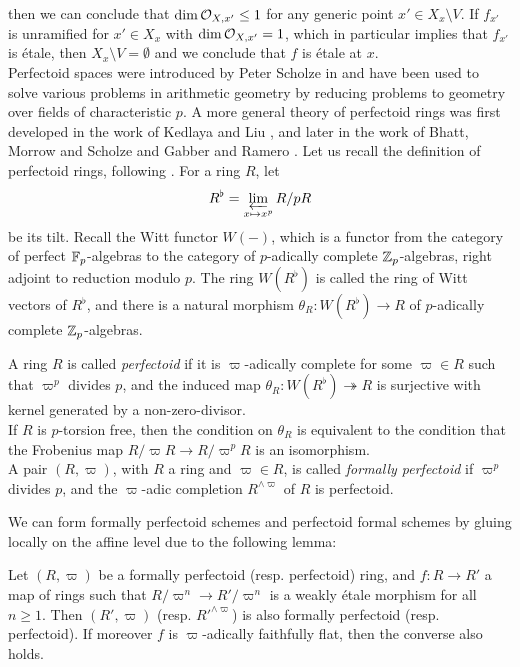 then we can conclude that $\dim \cal{O}_{X,x'} \le 1$ for any generic point $x' \in X_{x} \setminus V$. If $f_{x'}$ is unramified for $x' \in X_{x}$ with $\dim{\cal{O}_{X,x'}}=1$,
which in particular implies that $f_{x'}$ is \'{e}tale, then $X_{x} \setminus V = \emptyset$ and we conclude that $f$ is \'{e}tale at $x$.\\
\indent Perfectoid spaces were introduced by Peter Scholze in \cite{scholze2012perfectoid} and have been used to solve various problems in arithmetic geometry
by reducing problems to geometry over fields of characteristic $p$. A more general theory of perfectoid rings was first developed in
the work of Kedlaya and Liu \cite{kedlaya2015relative}, and later in the work of Bhatt, Morrow and Scholze \cite{bms} and Gabber and Ramero \cite{gabber2018almost}. 
Let us recall the definition of perfectoid rings, following \cite[Section 2.1]{purflat}. 
For a ring $R$, let 
\[R^{\flat} = \varprojlim_{x \mapsto x^p} R/pR\]
be its tilt.  Recall the Witt functor $W(-)$, which 
is a functor from the category of perfect $\bb{F}_p$-algebras to the category of $p$-adically complete $\bb{Z}_p$-algebras, right
adjoint to reduction modulo $p$. The ring $W(R^{\flat})$ is called the ring of Witt vectors of $R^{\flat}$, 
and there is a natural morphism $\theta_{R}: W(R^{\flat}) \to R$ of $p$-adically complete $\bb{Z}_p$-algebras.
\begin{definition}\label{def:perfectoid}
A ring $R$ is called \textit{perfectoid} if it is $\varpi$-adically complete for some $\varpi \in R$ such that $\varpi^p$ divides $p$,
and the induced map $\theta_{R}: W(R^{\flat}) \twoheadrightarrow R$ is surjective with kernel generated by a non-zero-divisor.\\
\indent If $R$ is $p$-torsion free, then the condition on $\theta_{R}$ is equivalent to the condition that the Frobenius map $R/\varpi R \to R/\varpi^p R$ is an isomorphism.\\
\indent A pair $(R,\varpi)$, with $R$ a ring and $\varpi \in R$, is called \textit{formally perfectoid} if $\varpi^p$ divides $p$, 
and the $\varpi$-adic completion $R^{\wedge \varpi}$ of $R$ is perfectoid.
\end{definition}
We can form formally perfectoid schemes and perfectoid formal schemes by gluing locally on the affine level due to the following lemma:
\begin{lemma}\label{lem:locperfectoid}
Let $(R,\varpi)$ be a formally perfectoid (resp. perfectoid) ring, and $f: R \to R'$ a map of rings 
such that $R/\varpi^n \to R'/\varpi^n$ is a weakly \'{e}tale morphism for all $n \ge 1$.
 Then $(R',\varpi)$ (resp. $R'^{\wedge \varpi}$) is also formally perfectoid (resp. perfectoid). If moreover
 $f$ is $\varpi$-adically faithfully flat, then the converse also holds.
\end{lemma}
